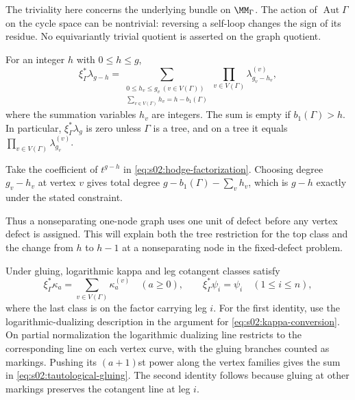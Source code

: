 The triviality here concerns the underlying bundle on $\MM_\Gamma$.
The action of $\operatorname{Aut}\Gamma$ on the cycle space can be
nontrivial: reversing a self-loop changes the sign of its residue.
No equivariantly trivial quotient is asserted on the graph quotient.

\begin{crl}
\label{crl:s02:defect-allocation}
For an integer $h$ with $0\leq h\leq g$,
\begin{equation}
\label{eq:s02:defect-allocation}
\xi_\Gamma^*\lambda_{g-h}
=\sum_{\substack{0\leq h_v\leq g_v\ (v\in V(\Gamma))\\
\sum_{v\in V(\Gamma)}h_v=h-b_1(\Gamma)}}
\prod_{v\in V(\Gamma)}\lambda_{g_v-h_v}^{(v)},
\end{equation}
where the summation variables $h_v$ are integers.  The sum is empty
if $b_1(\Gamma)>h$.  In particular, $\xi_\Gamma^*\lambda_g$ is zero
unless $\Gamma$ is a tree, and on a tree it equals
$\prod_{v\in V(\Gamma)}\lambda_{g_v}^{(v)}$.
\end{crl}

\begin{prf}
Take the coefficient of $t^{g-h}$ in
\eqref{eq:s02:hodge-factorization}.  Choosing degree $g_v-h_v$ at
vertex $v$ gives total degree
$g-b_1(\Gamma)-\sum_v h_v$, which is $g-h$ exactly under the stated
constraint.
\end{prf}

Thus a nonseparating one-node graph uses one unit of defect before any
vertex defect is assigned.  This will explain both the tree restriction
for the top class and the change from $h$ to $h-1$ at a nonseparating
node in the fixed-defect problem.

Under gluing, logarithmic kappa and leg cotangent classes satisfy
\begin{equation}
\label{eq:s02:tautological-gluing}
\xi_\Gamma^*\kappa_a=\sum_{v\in V(\Gamma)}\kappa_a^{(v)}
\quad(a\geq0),
\qquad
\xi_\Gamma^*\psi_i=\psi_i\quad(1\leq i\leq n),
\end{equation}
where the last class is on the factor carrying leg $i$.  For the first
identity, use the logarithmic-dualizing description in the argument for
\eqref{eq:s02:kappa-conversion}.  On partial normalization the
logarithmic dualizing line restricts to the corresponding line on each
vertex curve, with the gluing branches counted as markings.  Pushing
its $(a+1)$st power along the vertex families gives the sum in
\eqref{eq:s02:tautological-gluing}.  The second identity follows because
gluing at other markings preserves the cotangent line at leg $i$.
